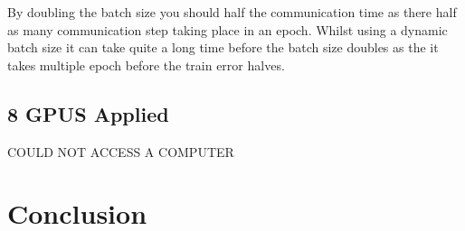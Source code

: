 \documentclass[11pt]{article}
\begin{document}
By doubling the batch size you should half the communication time as there half as many communication step taking place in an epoch. Whilst using a dynamic batch size it can take quite a long time before the batch size doubles as the it takes multiple epoch before the train error halves.


\subsection{8 GPUS Applied}
\begin{Huge}
\begin{center}
COULD NOT ACCESS A COMPUTER
\end{center}
\end{Huge}


\section{Conclusion}
 
\end{document}

